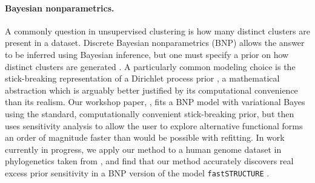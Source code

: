 \paragraph{Bayesian nonparametrics.}

A commonly question in unsupervised clustering is how many distinct clusters are
present in a dataset.  Discrete Bayesian nonparametrics (BNP) allows the answer
to be inferred using Bayesian inference, but one must specify a prior on how
distinct clusters are generated \citep{ghosh:2003:bnp,
gershman:2012:bnptutorial}.  A particularly common modeling choice is the
stick-breaking representation of a Dirichlet process prior
\citep{sethuraman:1994:constructivedp}, a mathematical abstraction which is
arguably better justified by its computational convenience than its realism. Our
workshop paper, \citet{giordano:2018:bnpsensitivity}, fits a BNP model with
variational Bayes \citep{blei:2006:dirichletbnp} using the standard,
computationally convenient stick-breaking prior, but then uses sensitivity
analysis to allow the user to explore alternative functional forms an order of
magnitude faster than would be possible with refitting. In work currently in
progress, we apply our method to a human genome dataset in phylogenetics taken
from \citep{huang:2011:haplotype}, and find that our method accurately discovers
real excess prior sensitivity in a BNP version of the model
\texttt{fastSTRUCTURE} \citep{raj:2014:faststructure}.


%


